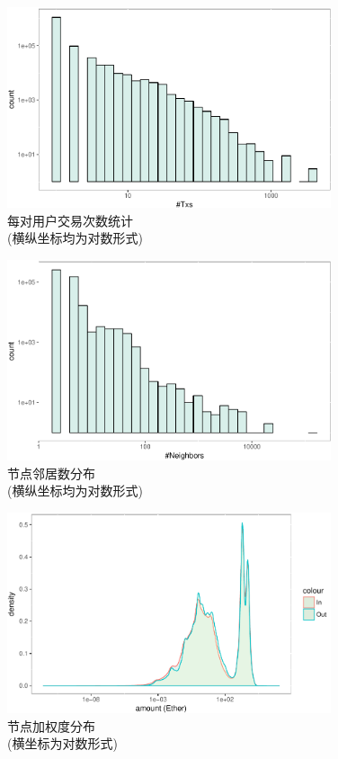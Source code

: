 \begin{figure}
\centering
	\includegraphics[width=0.85\textwidth]{figs/txnd.pdf}
	\caption{每对用户交易次数统计 \\ \small{(横纵坐标均为对数形式)}}\label{fig:txnd}
\end{figure}

\begin{figure}
	\centering
	\includegraphics[width=0.85\textwidth]{figs/nnd.pdf}
	\caption{节点邻居数分布 \\ \small{(横纵坐标均为对数形式)}}\label{fig:nnd}
\end{figure}

\begin{figure}
	\centering
	\includegraphics[width=0.85\textwidth]{figs/nwd.pdf}
	\caption{节点加权度分布 \\ \small{(横坐标为对数形式)} } \label{fig:nwd}
\end{figure}

